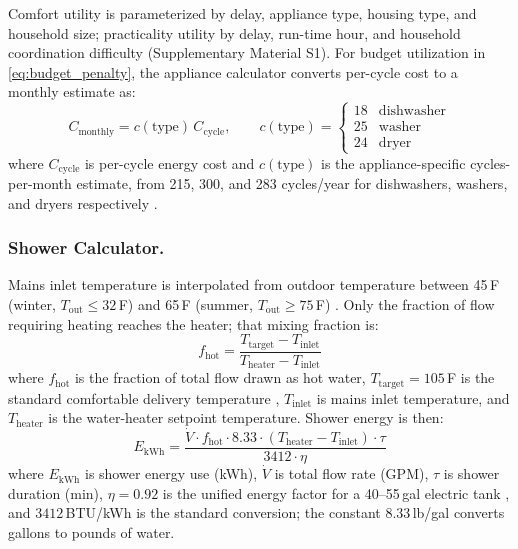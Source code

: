 \documentclass[a4paper,fleqn]{cas-dc}
\begin{document}
Comfort utility is parameterized by delay, appliance type, housing type, and household size; practicality utility by delay, run-time hour, and household coordination difficulty (Supplementary Material S1).
For budget utilization in \eqref{eq:budget_penalty}, the appliance calculator converts per-cycle cost to a monthly estimate as:
\begin{equation}
  C_{\mathrm{monthly}} = c(\mathrm{type})\,C_{\mathrm{cycle}}, \qquad
  c(\mathrm{type})=
  \begin{cases}
    18 & \text{dishwasher} \\[2pt]
    25 & \text{washer} \\[2pt]
    24 & \text{dryer}
  \end{cases}
  \label{eq:appliance_monthly_cost}
\end{equation}
\noindent where $C_{\mathrm{cycle}}$ is per-cycle energy cost and $c(\mathrm{type})$ is the appliance-specific cycles-per-month estimate, from 215, 300, and 283 cycles/year for dishwashers, washers, and dryers respectively \citep{energystar_dishwasher_criteria2023,energystar_clotheswasher,doe_dryer_tp_2011}.

\subsubsection{Shower Calculator.}
Mains inlet temperature is interpolated from outdoor temperature between 45\,\textdegree{}F (winter, $T_{\mathrm{out}} \le 32$\,\textdegree{}F) and 65\,\textdegree{}F (summer, $T_{\mathrm{out}} \ge 75$\,\textdegree{}F) \citep{hendron2008,backman2013}. Only the fraction of flow requiring heating reaches the heater; that mixing fraction is:
\begin{equation}
  f_{\mathrm{hot}} = \frac{T_{\mathrm{target}} - T_{\mathrm{inlet}}}
                          {T_{\mathrm{heater}} - T_{\mathrm{inlet}}}
  \label{eq:shower_fraction}
\end{equation}
\noindent where $f_{\mathrm{hot}}$ is the fraction of total flow drawn as hot water, $T_{\mathrm{target}} = 105$\,\textdegree{}F is the standard comfortable delivery temperature \citep{zhang2023}, $T_{\mathrm{inlet}}$ is mains inlet temperature, and $T_{\mathrm{heater}}$ is the water-heater setpoint temperature. Shower energy is then:
\begin{equation}
  E_{\mathrm{kWh}} = \frac{\dot{V} \cdot f_{\mathrm{hot}} \cdot 8.33 \cdot
                            (T_{\mathrm{heater}} - T_{\mathrm{inlet}}) \cdot \tau}
                          {3412 \cdot \eta}
  \label{eq:shower_energy}
\end{equation}
\noindent where $E_{\mathrm{kWh}}$ is shower energy use (kWh), $\dot{V}$ is total flow rate (GPM), $\tau$ is shower duration (min), $\eta = 0.92$ is the unified energy factor for a 40--55\,gal electric tank \citep{rheem2025}, and $3412$\,BTU/kWh is the standard conversion; the constant $8.33$\,lb/gal converts gallons to pounds of water.
\end{document}

